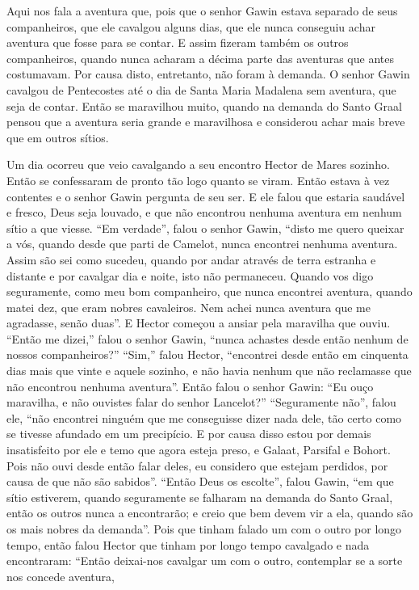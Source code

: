 Aqui nos fala a aventura que,  pois que o senhor Gawin estava separado
de seus companheiros, que ele cavalgou alguns dias, que ele nunca conseguiu
achar aventura que  fosse para se contar. E assim fizeram também os outros
companheiros, quando nunca acharam a décima parte das aventuras que antes
costumavam. Por causa disto, entretanto, não foram à demanda. O senhor Gawin
cavalgou de Pentecostes até o dia de Santa Maria Madalena sem aventura, que
seja de contar. Então se maravilhou muito, quando na demanda do Santo Graal
pensou que a aventura seria grande e maravilhosa e considerou achar mais breve
que em outros sítios.

Um dia ocorreu que veio cavalgando a seu encontro Hector de Mares sozinho. Então
se confessaram de pronto tão logo quanto se viram. Então estava à vez contentes
e o senhor Gawin pergunta de seu ser. E ele falou que estaria saudável e
fresco, Deus seja louvado, e que não encontrou nenhuma aventura em nenhum sítio
a que viesse. “Em verdade”, falou o senhor Gawin, “disto me quero queixar a
vós, quando desde que parti de Camelot, nunca encontrei nenhuma aventura. Assim
são sei como sucedeu, quando por andar através de terra estranha e distante e
por cavalgar dia e noite, isto não permaneceu. Quando vos digo seguramente,
como meu bom companheiro, que nunca encontrei aventura, quando matei dez, que
eram nobres cavaleiros. Nem achei nunca aventura que me agradasse, senão duas”.
E Hector começou a ansiar pela maravilha que ouviu. “Então me dizei,” falou o
senhor Gawin, “nunca achastes desde então nenhum de nossos companheiros?”
“Sim,” falou Hector, “encontrei desde então em cinquenta dias mais que vinte e
aquele sozinho, e não havia nenhum que não reclamasse que não encontrou nenhuma
aventura”. Então falou o senhor Gawin: “Eu ouço maravilha, e não ouvistes falar
do senhor Lancelot?” “Seguramente não”, falou ele, “não encontrei ninguém que
me conseguisse dizer nada dele, tão certo como se tivesse afundado em um
precipício. E por causa disso estou por demais insatisfeito por ele e temo que
agora esteja preso, e Galaat, Parsifal e Bohort. Pois não ouvi desde então
falar deles, eu considero que estejam perdidos, por causa de que não são
sabidos”. “Então Deus os escolte”, falou Gawin, “em que sítio estiverem,
quando seguramente se falharam na demanda do Santo Graal, então os outros nunca
a encontrarão; e creio que bem devem vir a ela, quando são os mais nobres da
demanda”. Pois que tinham falado um com o outro por longo tempo, então falou
Hector que tinham por longo tempo cavalgado e nada encontraram: “Então
deixai-nos cavalgar um com o outro, contemplar se a sorte nos concede aventura,
